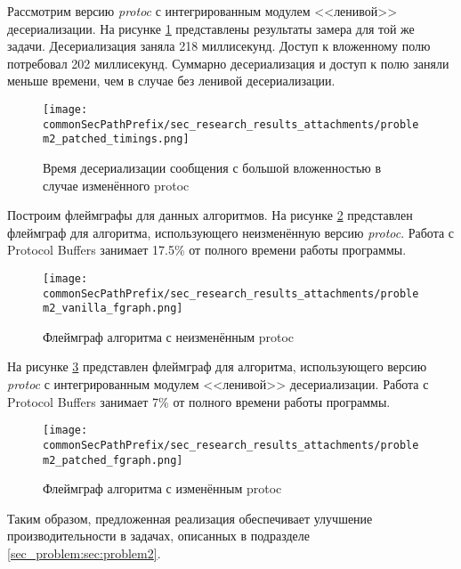 \newpage
Рассмотрим версию \textit{protoc} с интегрированным модулем <<ленивой>> десериализации.
На рисунке \ref{fig:problem2_patched_timings} представлены результаты замера для той же задачи. Десериализация заняла 218 миллисекунд. Доступ к вложенному полю потребовал 202 миллисекунд. Суммарно десериализация и доступ к полю заняли меньше времени, чем в случае без ленивой десериализации.

\begin{figure}[!ht]
    \centering
    \texttt{[image: \\commonSecPathPrefix/sec\_research\_results\_attachments/problem2\_patched\_timings.png]}
    \caption{Время десериализации сообщения с большой вложенностью в случае изменённого protoc}
    \label{fig:problem2_patched_timings}
\end{figure}

Построим флеймграфы для данных алгоритмов.
На рисунке \ref{fig:problem2_vanilla_fgraph} представлен флеймграф для алгоритма, использующего неизменённую версию \textit{protoc}. 
Работа с Protocol Buffers занимает 17.5\% от полного времени работы программы.

\begin{figure}[!ht]
    \centering
    \texttt{[image: \\commonSecPathPrefix/sec\_research\_results\_attachments/problem2\_vanilla\_fgraph.png]}
    \caption{Флеймграф алгоритма с неизменённым protoc}
    \label{fig:problem2_vanilla_fgraph}
\end{figure}

\pagebreak
На рисунке \ref{fig:problem2_patched_fgraph} представлен флеймграф для алгоритма, использующего версию \textit{protoc} с интегрированным модулем <<ленивой>> десериализации. 
Работа с Protocol Buffers занимает 7\% от полного времени работы программы.

\begin{figure}[!ht]
    \centering
    \texttt{[image: \\commonSecPathPrefix/sec\_research\_results\_attachments/problem2\_patched\_fgraph.png]}
    \caption{Флеймграф алгоритма с изменённым protoc}
    \label{fig:problem2_patched_fgraph}
\end{figure}

Таким образом, предложенная реализация обеспечивает улучшение производительности в задачах, описанных в подразделе \ref{sec_problem:sec:problem2}.
